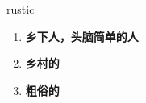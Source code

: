 
\begin{frame}
{\huge rustic}
\begin{center}
\begin{enumerate}\Large
  \item \textbf{乡下人，头脑简单的人}
  \item \textbf{乡村的}
  \item \textbf{粗俗的}
\end{enumerate}
\end{center}
\end{frame}
